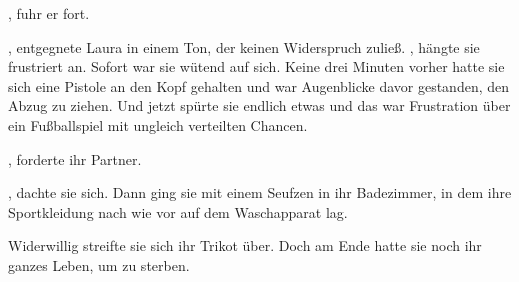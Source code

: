 , fuhr er fort.

\par

, entgegnete Laura in einem Ton, der keinen Widerspruch zuließ.
, hängte sie frustriert an.
Sofort war sie wütend auf sich.
Keine drei Minuten vorher hatte sie sich eine Pistole an den Kopf gehalten und war Augenblicke davor gestanden, den Abzug zu ziehen.
Und jetzt spürte sie endlich etwas und das war Frustration über ein Fußballspiel mit ungleich verteilten Chancen.

\par

, forderte ihr Partner.

\par

, dachte sie sich.
Dann ging sie mit einem Seufzen in ihr Badezimmer, in dem ihre Sportkleidung nach wie vor auf dem Waschapparat lag.

\par

Widerwillig streifte sie sich ihr Trikot über.
Doch am Ende hatte sie noch ihr ganzes Leben, um zu sterben.
